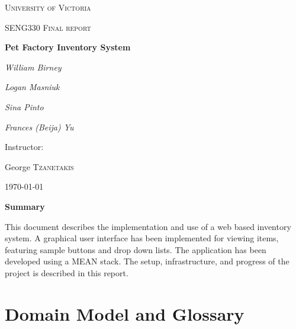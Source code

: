 \documentclass[letterpaper, 12pt]{article}
\title{\vspace{-8ex}}
\author{\vspace{-8ex}}
\date{\vspace{-7ex}}
\begin{document}
\fontsize{12}{12}

\begin{titlepage}
  \centering
  {\scshape\LARGE University of Victoria \par}
  \vspace{1cm}
  {\scshape\Large SENG330 Final report\par}
  \vspace{1.5cm}
  {\huge\bfseries Pet Factory Inventory System\par}
  \vspace{2cm}
  {\Large\itshape William Birney\par}
  {\Large\itshape Logan Masniuk\par}
  {\Large\itshape Sina Pinto\par}
  {\Large\itshape Frances (Beija) Yu\par}
  \vfill
  Instructor:\par
  George \textsc{Tzanetakis}

  \vfill

  {\large \today\par}
\end{titlepage}

\thispagestyle{fancy}

%
%
\noindent \large\textbf{Summary}

\noindent This document describes the implementation and use of a web based inventory system. A graphical user interface has been implemented for viewing items, featuring sample buttons and drop down lists. The application has been developed using a MEAN stack. The setup, infrastructure, and progress of the project is described in this report.


\tableofcontents

\newpage
%
%
%
%
%
%
%
%
\section{Domain Model and Glossary}
\end{document}
